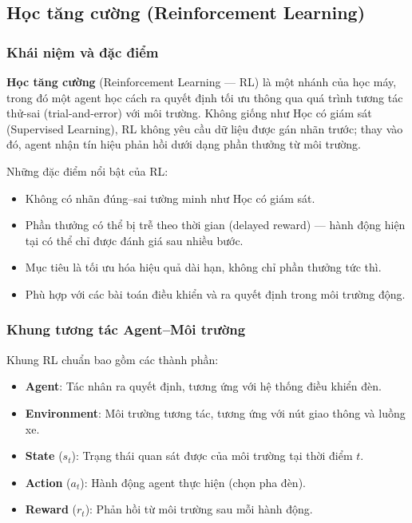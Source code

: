 \subsection{Học tăng cường (Reinforcement Learning)}

\subsubsection{Khái niệm và đặc điểm}

\textbf{Học tăng cường} (Reinforcement Learning --- RL) là một nhánh của học máy, trong đó một agent học cách ra quyết định tối ưu thông qua quá trình tương tác thử-sai (trial-and-error) với môi trường. Không giống như Học có giám sát (Supervised Learning), RL không yêu cầu dữ liệu được gán nhãn trước; thay vào đó, agent nhận tín hiệu phản hồi dưới dạng phần thưởng từ môi trường.

Những đặc điểm nổi bật của RL:
\begin{itemize}
    \item Không có nhãn đúng--sai tường minh như Học có giám sát.
    \item Phần thưởng có thể bị trễ theo thời gian (delayed reward) --- hành động hiện tại có thể chỉ được đánh giá sau nhiều bước.
    \item Mục tiêu là tối ưu hóa hiệu quả dài hạn, không chỉ phần thưởng tức thì.
    \item Phù hợp với các bài toán điều khiển và ra quyết định trong môi trường động.
\end{itemize}

\subsubsection{Khung tương tác Agent--Môi trường}

Khung RL chuẩn bao gồm các thành phần:
\begin{itemize}
    \item \textbf{Agent}: Tác nhân ra quyết định, tương ứng với hệ thống điều khiển đèn.
    \item \textbf{Environment}: Môi trường tương tác, tương ứng với nút giao thông và luồng xe.
    \item \textbf{State} ($s_t$): Trạng thái quan sát được của môi trường tại thời điểm $t$.
    \item \textbf{Action} ($a_t$): Hành động agent thực hiện (chọn pha đèn).
    \item \textbf{Reward} ($r_t$): Phản hồi từ môi trường sau mỗi hành động.
\end{itemize}


